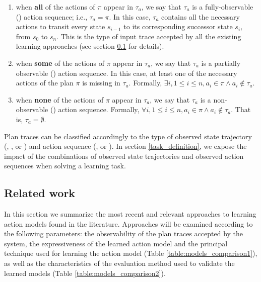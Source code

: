 \begin{enumerate}
\item \textcolor[rgb]{1.00,0.00,0.00}{when \textbf{all} of the actions of $\pi$ appear in $\tau_a$, we say that $\tau_a$ is a fully-observable (\FO) action sequence; i.e.,  $\tau_a=\pi$. In this case, $\tau_a$ contains all the necessary actions to transit every state $s_{i-1}$ to its corresponding successor state $s_{i}$, from $s_0$ to $s_n$. This is the type of input trace accepted by all the existing learning approaches (see section \ref{related_work} for details)}.
\item \textcolor[rgb]{1.00,0.00,0.00}{when \textbf{some} of the actions of $\pi$  appear in $\tau_a$, we say that $\tau_a$ is a partially observable (\PO) action sequence. In this case, at least one of the necessary actions of the plan $\pi$ is missing in $\tau_a$. Formally, $\exists i, 1 \leq i \leq n, a_i \in \pi \wedge a_i \notin \tau_a$.}
\item \textcolor[rgb]{1.00,0.00,0.00}{when \textbf{none} of the actions of $\pi$  appear in $\tau_a$, we say that $\tau_a$ is a non-observable (\NO) action sequence. Formally, $\forall i, 1 \leq i \leq n, a_i \in \pi \wedge a_i \notin \tau_a$. That is, $\tau_a = \emptyset$.}
\end{enumerate}


Plan traces can be classified accordingly to the type of observed state trajectory (\FO, \POstar, \PO or \NO) and action sequence (\FO, \PO or \NO). \textcolor[rgb]{1.00,0.00,0.00}{In section \ref{task_definition}, we expose the impact of the combinations of observed state trajectories and observed action sequences when solving a learning task.}




\subsection{Related work}
\label{related_work}

In this section we summarize the most recent and relevant approaches to learning action models found in the literature. Approaches will be examined according to the following parameters: the observability of the plan traces accepted by the system, the expressiveness of the learned action model and the principal technique used for learning the action model (Table \ref{table:models_comparison1}), as well as the characteristics of the evaluation method used to validate the learned models (Table \ref{table:models_comparison2}).

